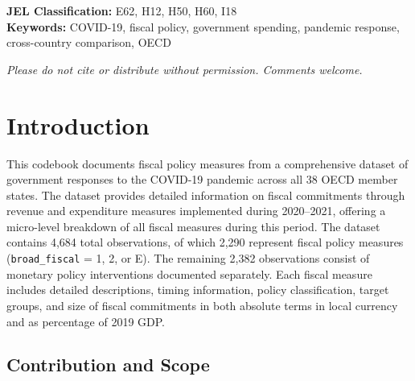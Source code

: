 \documentclass[12pt]{article}
\begin{document}
\begin{titlepage}
\begin{center}
\begin{minipage}{0.85\textwidth}
\end{minipage}

\vspace{1.5cm}

\begin{minipage}{0.85\textwidth}
\textbf{JEL Classification:} E62, H12, H50, H60, I18\\[0.3cm]
\textbf{Keywords:} COVID-19, fiscal policy, government spending, pandemic response, cross-country comparison, OECD
\end{minipage}


\vfill

\begin{minipage}{0.85\textwidth}
\centering
\footnotesize
\textit{Please do not cite or distribute without permission. Comments welcome.}
\end{minipage}

\end{center}
\end{titlepage}




\tableofcontents
\newpage

\section{Introduction}

This codebook documents fiscal policy measures from a comprehensive dataset of government responses to the COVID-19 pandemic across all 38 OECD member states. The dataset provides detailed information on fiscal commitments through revenue and expenditure measures implemented during 2020--2021, offering a micro-level breakdown of all fiscal measures during this period. The dataset contains 4,684 total observations, of which 2,290 represent fiscal policy measures (\texttt{broad\_fiscal} = 1, 2, or E). The remaining 2,382 observations consist of monetary policy interventions documented separately. Each fiscal measure includes detailed descriptions, timing information, policy classification, target groups, and size of fiscal commitments in both absolute terms in local currency and as percentage of 2019 GDP.

\subsection{Contribution and Scope}
\end{document}
